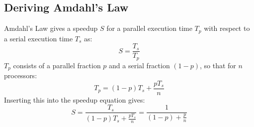 \subsection{Deriving Amdahl's Law}
Amdahl's Law gives a speedup \( S \) for a parallel execution time \(T_p\) with respect to a serial execution time \(T_s\) as:
\[S=\frac{T_s}{T_p}\]
\(T_p\) consists of a parallel fraction \(p\) and a serial fraction \((1-p)\), so that for \(n\) processors:
\[T_p=(1-p)T_s+\frac{pT_s}{n}\]
Inserting this into the speedup equation gives:
\[S=\frac{T_s}{(1-p)T_s+\frac{pT_s}{n}}=\frac{1}{(1-p)+\frac{p}{n}}\]